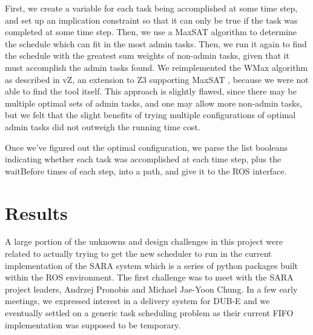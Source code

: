 \documentclass[11pt]{article}
\begin{document}
First, we create a variable
for each task being accomplished
at some time step,
and set up an implication constraint
so that it can only be true
if the task was completed at some time step.
Then, we use a MaxSAT algorithm
to determine the schedule which can fit in the most admin tasks.
Then, we run it again to find the schedule with the greatest
sum weights of non-admin tasks,
given that it must accomplish the admin tasks found.
We reimplemented the WMax algorithm
as described in vZ, an extension to Z3 supporting MaxSAT \cite{vZ},
because we were not able to find the tool itself.
This approach is slightly flawed,
since there may be multiple optimal sets of admin tasks,
and one may allow more non-admin tasks,
but we felt that the slight benefits
of trying multiple configurations of optimal admin tasks
did not outweigh the running time cost.

Once we've figured out the optimal configuration,
we parse the list booleans
indicating whether each task was accomplished at each time step,
plus the waitBefore times of each step,
into a path, and give it to the ROS interface.


\section{Results}
A large portion of the unknowns and design
challenges in this project were related to
actually trying to get the new scheduler to
run in the current implementation of the SARA
system which is a series of python packages
built within the ROS environment. The first
challenge was to meet with the SARA project
leaders, Andrzej Pronobis and Michael Jae-Yoon
Chung. In a few early meetings, we expressed
interest in a delivery system for DUB-E and we
eventually settled on a generic task scheduling
problem as their current FIFO implementation was
supposed to be temporary.
\end{document}
